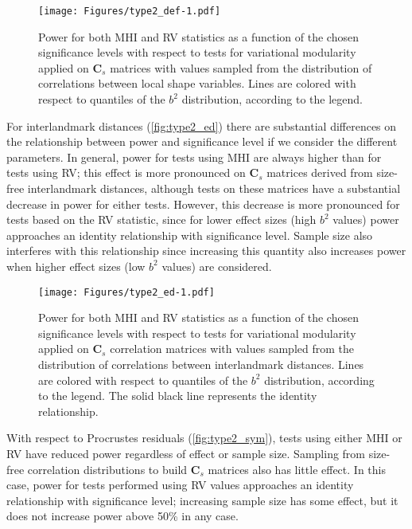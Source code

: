 \documentclass[12pt,twoside]{report}
\begin{document}
\begin{figure}[htbp]
\centering
\texttt{[image: Figures/type2\_def-1.pdf]}
\caption{Power for both MHI and RV statistics as a function of the
chosen significance levels with respect to tests for variational
modularity applied on $\mathbf{C}_s$ matrices with values sampled from
the distribution of correlations between local shape variables. Lines
are colored with respect to quantiles of the $b^2$ distribution,
according to the legend. \label{fig:type2_def}}
\end{figure}

For interlandmark distances (\autoref{fig:type2_ed}) there are
substantial differences on the relationship between power and
significance level if we consider the different parameters. In general,
power for tests using MHI are always higher than for tests using RV;
this effect is more pronounced on $\mathbf{C}_s$ matrices derived from
size-free interlandmark distances, although tests on these matrices have
a substantial decrease in power for either tests. However, this decrease
is more pronounced for tests based on the RV statistic, since for lower
effect sizes (high $b^2$ values) power approaches an identity
relationship with significance level. Sample size also interferes with
this relationship since increasing this quantity also increases power
when higher effect sizes (low $b^2$ values) are considered.

\begin{figure}[htbp]
\centering
\texttt{[image: Figures/type2\_ed-1.pdf]}
\caption{Power for both MHI and RV statistics as a function of the
chosen significance levels with respect to tests for variational
modularity applied on $\mathbf{C}_s$ correlation matrices with values
sampled from the distribution of correlations between interlandmark
distances. Lines are colored with respect to quantiles of the $b^2$
distribution, according to the legend. The solid black line represents
the identity relationship. \label{fig:type2_ed}}
\end{figure}

With respect to Procrustes residuals (\autoref{fig:type2_sym}), tests
using either MHI or RV have reduced power regardless of effect or sample
size. Sampling from size-free correlation distributions to build
$\mathbf{C}_s$ matrices also has little effect. In this case, power for
tests performed using RV values approaches an identity relationship with
significance level; increasing sample size has some effect, but it does
not increase power above 50\% in any case.
\end{document}

